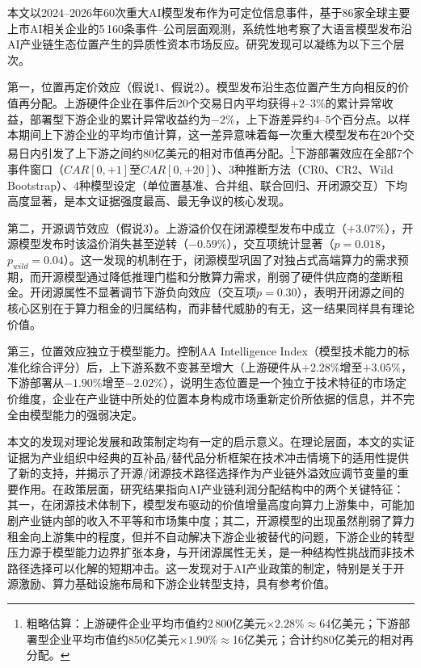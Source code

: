 \documentclass[11pt,fontset=fandol,a4paper]{ctexart}
\newcommand{\changed}[1]{{\color{orange!85!black}#1}}
\begin{document}
\changed{本文以2024--2026年60次重大AI模型发布作为可定位信息事件，基于86家全球主要上市AI相关企业的5\,160条事件--公司层面观测，系统性地考察了大语言模型发布沿AI产业链生态位置产生的异质性资本市场反应。研究发现可以凝练为以下三个层次。}

\changed{第一，位置再定价效应（假说1、假说2）。模型发布沿生态位置产生方向相反的价值再分配。上游硬件企业在事件后20个交易日内平均获得$+2$--$3\%$的累计异常收益，部署型下游企业的累计异常收益约为$-2\%$，上下游差异约4--5个百分点。以样本期间上下游企业的平均市值计算，这一差异意味着每一次重大模型发布在20个交易日内引发了上下游之间约80亿美元的相对市值再分配。\footnote{粗略估算：上游硬件企业平均市值约2\,800亿美元$\times 2.28\%\approx$64亿美元；下游部署型企业平均市值约850亿美元$\times 1.90\%\approx$16亿美元；合计约80亿美元的相对再分配。}下游部署效应在全部7个事件窗口（$CAR[0,+1]$至$CAR[0,+20]$）、3种推断方法（CR0、CR2、Wild Bootstrap）、4种模型设定（单位置基准、合并组、联合回归、开闭源交互）下均高度显著，是本文证据强度最高、最无争议的核心发现。}

第二，开源调节效应（假说3）。上游溢价仅在闭源模型发布中成立（$+3.07\%$），开源模型发布时该溢价消失甚至逆转（$-0.59\%$），交互项统计显著（$p=0.018$，$p_{wild}=0.04$）。这一发现的机制在于，闭源模型巩固了对独占式高端算力的需求预期，而开源模型通过降低推理门槛和分散算力需求，削弱了硬件供应商的垄断租金。开闭源属性不显著调节下游负向效应（交互项$p=0.30$），表明开闭源之间的核心区别在于算力租金的归属结构，而非替代威胁的有无，这一结果同样具有理论价值。

第三，位置效应独立于模型能力。控制AA Intelligence Index（模型技术能力的标准化综合评分）后，上下游系数不变甚至增大（上游硬件从$+2.28\%$增至$+3.05\%$，下游部署从$-1.90\%$增至$-2.02\%$），说明生态位置是一个独立于技术特征的市场定价维度，企业在产业链中所处的位置本身构成市场重新定价所依据的信息，并不完全由模型能力的强弱决定。

本文的发现对理论发展和政策制定均有一定的启示意义。在理论层面，本文的实证证据为产业组织中经典的互补品/替代品分析框架在技术冲击情境下的适用性提供了新的支持，并揭示了开源/闭源技术路径选择作为产业链外溢效应调节变量的重要作用。在政策层面，研究结果指向AI产业链利润分配结构中的两个关键特征：其一，在闭源技术体制下，模型发布驱动的价值增量高度向算力上游集中，可能加剧产业链内部的收入不平等和市场集中度；其二，开源模型的出现虽然削弱了算力租金向上游集中的程度，但并不自动解决下游企业被替代的问题，下游企业的转型压力源于模型能力边界扩张本身，与开闭源属性无关，是一种结构性挑战而非技术路径选择可以化解的短期冲击。这一发现对于AI产业政策的制定，特别是关于开源激励、算力基础设施布局和下游企业转型支持，具有参考价值。
\end{document}
